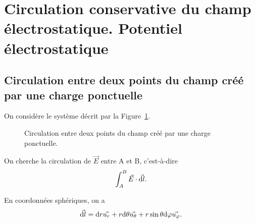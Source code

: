 \section{Circulation conservative du champ électrostatique. Potentiel électrostatique}

    \subsection{Circulation entre deux points du champ créé par une charge ponctuelle}

        On considère le système décrit par la Figure~\ref{fig:circulation_deux_points_champ_cree_charge_ponctuelle}.

        \begin{figure}
            \centering
            \caption{Circulation entre deux points du champ créé par une charge ponctuelle.}    
            \label{fig:circulation_deux_points_champ_cree_charge_ponctuelle}
        \end{figure}
        
        On cherche la circulation de $\vec{E}$ entre A et B, c'est-à-dire 
        \begin{equation}
            \int_{A}^{B}\vec{E}\cdot\vec{\mathrm{d} l}.
        \end{equation}

        En coordonnées sphériques, on a
        \begin{equation}
            \vec{\mathrm{d} l}=\mathrm{d} r\vec{u_r}+r\mathrm{d}\theta\vec{u_{\theta}}+r\sin\theta\mathrm{d}\varphi\vec{u_{\varphi}}.
        \end{equation}

